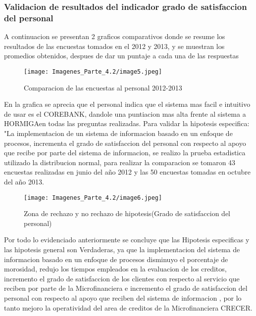 \documentclass[12 pt, letterpaper]{article}
\begin{document}
\subsubsection{Validacion de resultados del indicador grado de satisfaccion del personal}
A continuacion se presentan 2 graficos comparativos donde se resume los resultados de las encuestas tomados en el 2012 y 2013, y se muestran los promedios obtenidos, despues de dar un puntaje a cada una de las respuestas
\begin{figure}[H]
    \texttt{[image: Imagenes\_Parte\_4.2/image5.jpeg]}
    \caption{Comparacion de las encuestas al personal 2012-2013}
\end{figure}
En la grafica se aprecia que el personal indica que el sistema mas facil e intuitivo de usar es el COREBANK, dandole una puntiacion mas alta frente al sistema a HORMIGAen todas las preguntas realizadas.
Para validar la hipotesis especifica: "La implementacion de un sistema de informacion basado en un enfoque de procesos, incrementa el grado de satisfaccion del personal con respecto al apoyo que recibe por parte del sistema de informacion, se realizo la prueba estadistica utilizado la distribucion normal, para realizar la comparacion se tomaron 43 encuestas realizadas en junio del año 2012 y las 50 encuestas tomadas en octubre del año 2013.
\begin{figure}[H]
    \texttt{[image: Imagenes\_Parte\_4.2/image6.jpeg]}
    \caption{Zona de rechazo y no rechazo de hipotesis(Grado de satisfaccion del personal)}
\end{figure}
Por todo lo evidenciado anteriormente se concluye que las Hipotesis especificas y las hipotesis general son Verdaderas, ya que la implementacion del sistema de informacion basado en un enfoque de procesos disminuyo el porcentaje de morosidad, redujo los tiempos empleados en la evaluacion de los creditos, incremento el grado de satisfaccion de los clientes con respecto al servicio que reciben por parte de la Microfinanciera e incremento el grado de satisfaccion del personal con respecto al apoyo que reciben del sistema de informacion , por lo tanto mejoro la operatividad del area de creditos de la Microfinanciera CRECER.
\end{document}
